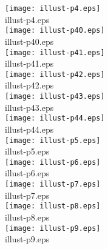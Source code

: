 \texttt{[image: illust-p4.eps]}\\illust-p4.eps\\


\texttt{[image: illust-p40.eps]}\\illust-p40.eps\\


\texttt{[image: illust-p41.eps]}\\illust-p41.eps\\


\texttt{[image: illust-p42.eps]}\\illust-p42.eps\\


\texttt{[image: illust-p43.eps]}\\illust-p43.eps\\


\texttt{[image: illust-p44.eps]}\\illust-p44.eps\\


\texttt{[image: illust-p5.eps]}\\illust-p5.eps\\


\texttt{[image: illust-p6.eps]}\\illust-p6.eps\\


\texttt{[image: illust-p7.eps]}\\illust-p7.eps\\


\texttt{[image: illust-p8.eps]}\\illust-p8.eps\\


\texttt{[image: illust-p9.eps]}\\illust-p9.eps\\


